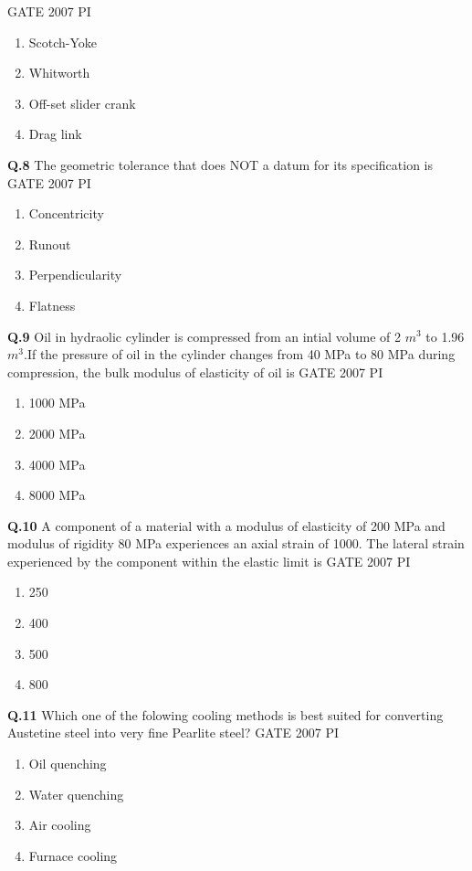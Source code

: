\documentclass[journal,12pt,onecolumn]{exam}
\theoremstyle{remark}
\begin{document}
\hfill{GATE 2007 PI}
\begin{enumerate}
    \item Scotch-Yoke
    \item Whitworth
    \item Off-set slider crank
    \item Drag link
    \end{enumerate}
    \noindent
    \textbf{Q.8}
    The geometric tolerance that does NOT a datum for its specification is 
    \hfill{GATE 2007 PI}
    \begin{enumerate}
        \item Concentricity
        \item Runout
        \item Perpendicularity
        \item Flatness
    \end{enumerate}
    \noindent
    \textbf{Q.9}
    Oil in hydraolic cylinder is compressed from an intial volume of 2 $m^3$ to 1.96 $m^3$.If the pressure of oil in the cylinder changes from 40 MPa to 80 MPa during compression, the bulk modulus of elasticity of oil is
    \hfill{GATE 2007 PI}
    \begin{enumerate}
        \item 1000 MPa
        \item 2000 MPa
        \item 4000 MPa
        \item 8000 MPa
    \end{enumerate}
    \noindent
    \textbf{Q.10}
    A component of a material with a modulus of elasticity of 200 MPa and modulus of rigidity 80 MPa experiences an axial strain of 1000. The lateral strain experienced by the component within the elastic limit is
    \hfill{GATE 2007 PI}
    \begin{enumerate}
        \item 250
        \item 400
        \item 500
        \item 800
    \end{enumerate}
    \noindent
    \textbf{Q.11}
    Which one of the folowing cooling methods is best suited for converting Austetine steel into very fine Pearlite steel?
    \hfill{GATE 2007 PI} 
    \begin{enumerate}
        \item Oil quenching
        \item Water quenching
        \item Air cooling
        \item Furnace cooling
        \end{enumerate}
\end{document}
